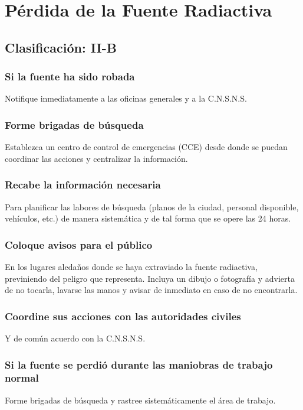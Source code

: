 \section{Pérdida de la Fuente Radiactiva}

\subsection*{Clasificación: II-B}

\subsubsection{Si la fuente ha sido robada}
Notifique inmediatamente a las oficinas generales y a la C.N.S.N.S.

\subsubsection{Forme brigadas de búsqueda}
Establezca un centro de control de emergencias (CCE) desde donde se puedan coordinar las acciones y centralizar la información.

\subsubsection{Recabe la información necesaria}
Para planificar las labores de búsqueda (planos de la ciudad, personal disponible, vehículos, etc.) de manera sistemática y de tal forma que se opere las 24 horas.

\subsubsection{Coloque avisos para el público}
En los lugares aledaños donde se haya extraviado la fuente radiactiva, previniendo del peligro que representa. Incluya un dibujo o fotografía y advierta de no tocarla, lavarse las manos y avisar de inmediato en caso de no encontrarla.

\subsubsection{Coordine sus acciones con las autoridades civiles}
Y de común acuerdo con la C.N.S.N.S.

\subsubsection{Si la fuente se perdió durante las maniobras de trabajo normal}
Forme brigadas de búsqueda y rastree sistemáticamente el área de trabajo.